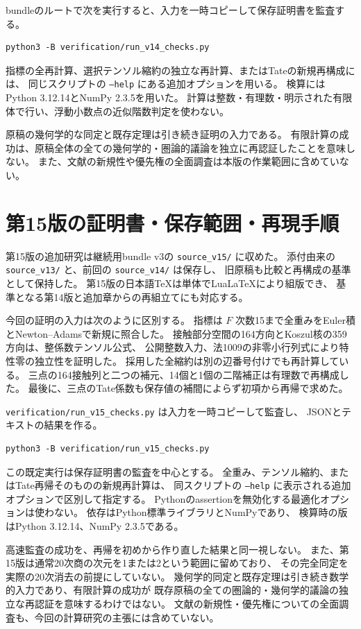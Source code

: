 \documentclass[a4paper,11pt]{ltjsarticle}
\theoremstyle{definition}
\begin{document}
bundleのルートで次を実行すると、入力を一時コピーして保存証明書を監査する。
\begin{verbatim}
python3 -B verification/run_v14_checks.py
\end{verbatim}
指標の全再計算、選択テンソル縮約の独立な再計算、またはTateの新規再構成には、
同じスクリプトの \texttt{--help} にある追加オプションを用いる。
検算にはPython 3.12.14とNumPy 2.3.5を用いた。
計算は整数・有理数・明示された有限体で行い、浮動小数点の近似階数判定を使わない。

原稿の幾何学的な同定と既存定理は引き続き証明の入力である。
有限計算の成功は、原稿全体の全ての幾何学的・圏論的議論を独立に再認証したことを意味しない。
また、文献の新規性や優先権の全面調査は本版の作業範囲に含めていない。


\section{第15版の証明書・保存範囲・再現手順}
\label{app:v15-reproducibility}

第15版の追加研究は継続用bundle v3の \texttt{source\_v15/} に収めた。
添付由来の \texttt{source\_v13/} と、前回の \texttt{source\_v14/} は保存し、
旧原稿も比較と再構成の基準として保持した。
第15版の日本語TeXは単体でLuaLaTeXにより組版でき、
基準となる第14版と追加章からの再組立てにも対応する。

今回の証明の入力は次のように区別する。
指標は $F$ 次数15まで全重みをEuler積とNewton--Adamsで新規に照合した。
接触部分空間の164方向とKoszul核の359方向は、整係数テンソル公式、
公開整数入力、法1009の非零小行列式により特性零の独立性を証明した。
採用した全縮約は別の辺番号付けでも再計算している。
三点の164接触列と二つの補元、14個と1個の二階補正は有理数で再構成した。
最後に、三点のTate係数も保存値の補間によらず初項から再帰で求めた。

\nolinkurl{verification/run_v15_checks.py} は入力を一時コピーして監査し、
JSONとテキストの結果を作る。
\begin{verbatim}
python3 -B verification/run_v15_checks.py
\end{verbatim}
この既定実行は保存証明書の監査を中心とする。
全重み、テンソル縮約、またはTate再帰そのものの新規再計算は、
同スクリプトの \texttt{--help} に表示される追加オプションで区別して指定する。
Pythonのassertionを無効化する最適化オプションは使わない。
依存はPython標準ライブラリとNumPyであり、
検算時の版はPython 3.12.14、NumPy 2.3.5である。

高速監査の成功を、再帰を初めから作り直した結果と同一視しない。
また、第15版は通常20次商の次元を1または2という範囲に留めており、
その完全同定を実際の20次消去の前提にしていない。
幾何学的同定と既存定理は引き続き数学的入力であり、有限計算の成功が
既存原稿の全ての圏論的・幾何学的議論の独立な再認証を意味するわけではない。
文献の新規性・優先権についての全面調査も、今回の計算研究の主張には含めていない。
\end{document}
